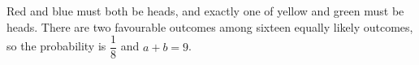 Red and blue must both be heads, and exactly one of yellow and green must be heads. There are two favourable outcomes among sixteen equally likely outcomes, so the probability is $\dfrac{1}{8}$ and $\boxed{a+b=9}$.
